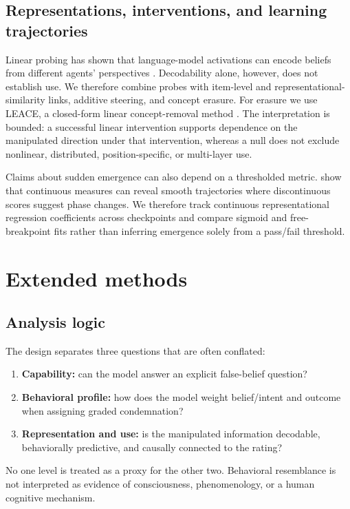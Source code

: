 \subsection{Representations, interventions, and learning trajectories}

Linear probing has shown that language-model activations can encode beliefs from different agents' perspectives \citep{zhu2024beliefs}.
Decodability alone, however, does not establish use.
We therefore combine probes with item-level and representational-similarity links, additive steering, and concept erasure.
For erasure we use LEACE, a closed-form linear concept-removal method \citep{belrose2023leace}.
The interpretation is bounded: a successful linear intervention supports dependence on the manipulated direction under that intervention, whereas a null does not exclude nonlinear, distributed, position-specific, or multi-layer use.

Claims about sudden emergence can also depend on a thresholded metric.
\citet{schaeffer2023emergent} show that continuous measures can reveal smooth trajectories where discontinuous scores suggest phase changes.
We therefore track continuous representational regression coefficients across checkpoints and compare sigmoid and free-breakpoint fits rather than inferring emergence solely from a pass/fail threshold.

\section{Extended methods}

\subsection{Analysis logic}

The design separates three questions that are often conflated:
\begin{enumerate}[leftmargin=*]
    \item \textbf{Capability:} can the model answer an explicit false-belief question?
    \item \textbf{Behavioral profile:} how does the model weight belief/intent and outcome when assigning graded condemnation?
    \item \textbf{Representation and use:} is the manipulated information decodable, behaviorally predictive, and causally connected to the rating?
\end{enumerate}
No one level is treated as a proxy for the other two.
Behavioral resemblance is not interpreted as evidence of consciousness, phenomenology, or a human cognitive mechanism.


